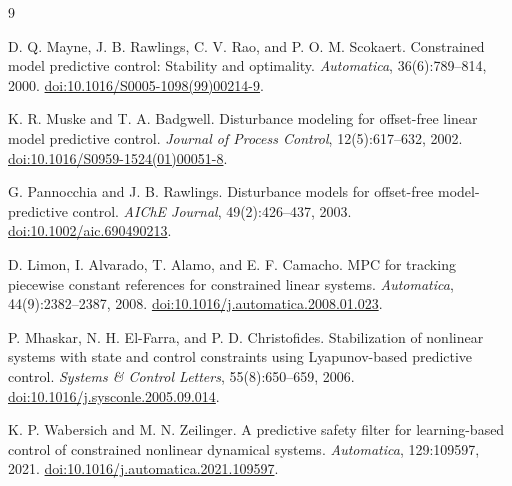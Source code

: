 \documentclass[11pt]{article}
\begin{document}
\begin{thebibliography}{9}

D. Q. Mayne, J. B. Rawlings, C. V. Rao, and P. O. M. Scokaert.
\newblock Constrained model predictive control: Stability and optimality.
\newblock \emph{Automatica}, 36(6):789--814, 2000.
\newblock \href{https://doi.org/10.1016/S0005-1098(99)00214-9}{doi:10.1016/S0005-1098(99)00214-9}.

K. R. Muske and T. A. Badgwell.
\newblock Disturbance modeling for offset-free linear model predictive control.
\newblock \emph{Journal of Process Control}, 12(5):617--632, 2002.
\newblock \href{https://doi.org/10.1016/S0959-1524(01)00051-8}{doi:10.1016/S0959-1524(01)00051-8}.

G. Pannocchia and J. B. Rawlings.
\newblock Disturbance models for offset-free model-predictive control.
\newblock \emph{AIChE Journal}, 49(2):426--437, 2003.
\newblock \href{https://doi.org/10.1002/aic.690490213}{doi:10.1002/aic.690490213}.

D. Limon, I. Alvarado, T. Alamo, and E. F. Camacho.
\newblock MPC for tracking piecewise constant references for constrained linear systems.
\newblock \emph{Automatica}, 44(9):2382--2387, 2008.
\newblock \href{https://doi.org/10.1016/j.automatica.2008.01.023}{doi:10.1016/j.automatica.2008.01.023}.

P. Mhaskar, N. H. El-Farra, and P. D. Christofides.
\newblock Stabilization of nonlinear systems with state and control constraints using Lyapunov-based predictive control.
\newblock \emph{Systems \& Control Letters}, 55(8):650--659, 2006.
\newblock \href{https://doi.org/10.1016/j.sysconle.2005.09.014}{doi:10.1016/j.sysconle.2005.09.014}.

K. P. Wabersich and M. N. Zeilinger.
\newblock A predictive safety filter for learning-based control of constrained nonlinear dynamical systems.
\newblock \emph{Automatica}, 129:109597, 2021.
\newblock \href{https://doi.org/10.1016/j.automatica.2021.109597}{doi:10.1016/j.automatica.2021.109597}.

\end{thebibliography}
\end{document}

